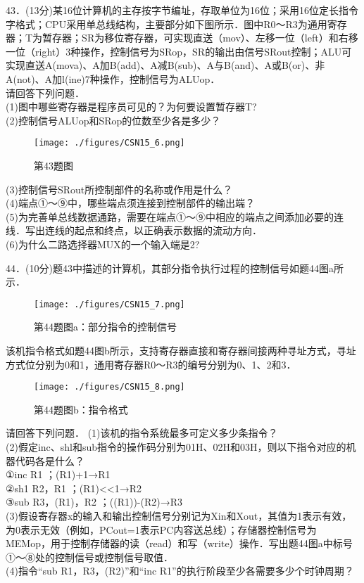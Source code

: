 43．(13分)某16位计算机的主存按字节编址，存取单位为16位；采用16位定长指令字格式；CPU采用单总线结构，主要部分如下图所示．图中R0～R3为通用寄存器；T为暂存器；SR为移位寄存器，可实现直送（mov）、左移一位（left）和右移一位（right）3种操作，控制信号为SRop，SR的输出由信号SRout控制；ALU可实现直送A(mova)、A加B(add)、A减B(sub)、A与B(and)、A或B(or)、非A(not)、A加l(ine)7种操作，控制信号为ALUop． \\
请回答下列问题． \\
(1)图中哪些寄存器是程序员可见的？为何要设置暂存器T? \\
(2)控制信号ALUop和SRop的位数至少各是多少？
\begin{figure}[ht]
\centering
\texttt{[image: ./figures/CSN15\_6.png]}
\caption{第43题图} \label{CSN15_fig6}
\end{figure}
(3)控制信号SRout所控制部件的名称或作用是什么？ \\
(4)端点①～⑨中，哪些端点须连接到控制部件的输出端？ \\
(5)为完善单总线数据通路，需要在端点①～⑨中相应的端点之间添加必要的连线．写出连线的起点和终点，以正确表示数据的流动方向． \\
(6)为什么二路选择器MUX的一个输入端是2?

44．(10分)题43中描述的计算机，其部分指令执行过程的控制信号如题44图a所示．
\begin{figure}[ht]
\centering
\texttt{[image: ./figures/CSN15\_7.png]}
\caption{第44题图a：部分指令的控制信号} \label{CSN15_fig7}
\end{figure}
该机指令格式如题44图b所示，支持寄存器直接和寄存器间接两种寻址方式，寻址方式位分别为0和1，通用寄存器R0～R3的编号分别为0、1、2和3．
\begin{figure}[ht]
\centering
\texttt{[image: ./figures/CSN15\_8.png]}
\caption{第44题图b：指令格式} \label{CSN15_fig8}
\end{figure}
请回答下列问题．
(1)该机的指令系统最多可定义多少条指令？ \\
(2)假定inc、shl和sub指令的操作码分别为01H、02H和03H，则以下指令对应的机器代码各是什么？ \\
①inc R1 ；(R1)+1→R1 \\
②sh1 R2，R1 ；(R1)<<1→R2 \\
③sub R3，(R1)，R2 ；((R1))-(R2)→R3 \\
(3)假设寄存器x的输入和输出控制信号分别记为Xin和Xout，其值为1表示有效，为0表示无效（例如，PCout=1表示PC内容送总线）；存储器控制信号为MEMop，用于控制存储器的读（read）和写（write）操作．写出题44图a中标号①～⑧处的控制信号或控制信号取值． \\
(4)指令“sub R1，R3，(R2)”和“inc R1”的执行阶段至少各需要多少个时钟周期？

